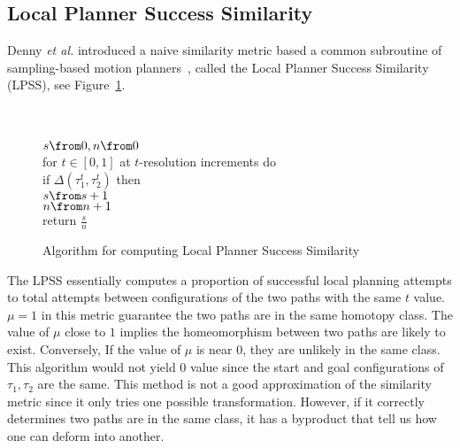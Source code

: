 \subsection{Local Planner Success Similarity}
Denny \emph{et al.} introduced a naive similarity metric based a common subroutine of sampling-based motion planners~\cite{kavraki1996probabilistic}, called the Local Planner Success Similarity (LPSS), see Figure~\ref{fig:lpss}.
\begin{figure}
  \begin{algo}
    \+
    \\ 
    \\ \(s\from 0, n\from 0\)
    \\ for \(t\in[0,1]\) at \(t\)-resolution increments do\+
    \\ if \(\Delta(\tau^t_1,\tau^t_2)\) then\+
    \\ \(s\from s+1\)\-
    \\ \(n\from n+1\)\-
    \\ return \(\frac{s}{n}\)\-
  \end{algo}
  \caption{Algorithm for computing Local Planner Success Similarity}
  \label{fig:lpss}
\end{figure}
The LPSS essentially computes a proportion of successful local planning attempts to total attempts between configurations of the two paths with the same \(t\) value. \(\mu=1\) in this metric guarantee the two paths are in the same homotopy class. The value of \(\mu\) close to \(1\) implies the homeomorphism between two paths are likely to exist. Conversely, If the value of \(\mu\) is near \(0\), they are unlikely in the same class. This algorithm would not yield \(0\) value since the start and goal configurations of \(\tau_1,\tau_2\) are the same. This method is not a good approximation of the similarity metric since it only tries one possible transformation. However, if it correctly determines two paths are in the same class, it has a byproduct that tell us how one can deform into another.
